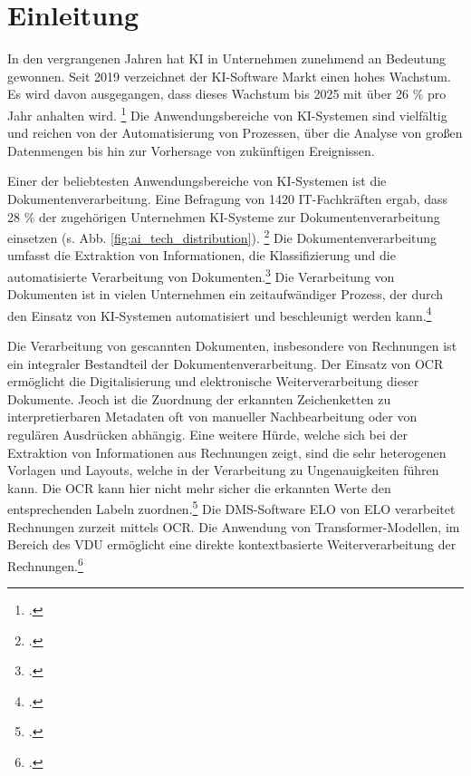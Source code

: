 \chapter{Einleitung}

In den vergrangenen Jahren hat \ac{KI} in Unternehmen zunehmend an Bedeutung gewonnen. Seit 2019 verzeichnet der KI-Software Markt einen hohes Wachstum. Es wird davon ausgegangen, dass dieses Wachstum bis 2025 mit über 26 \% pro Jahr anhalten wird. \footcites[Vgl.][]{howarth_57_2024} Die Anwendungsbereiche von KI-Systemen sind vielfältig und reichen von der Automatisierung von Prozessen, über die Analyse von großen Datenmengen bis hin zur Vorhersage von zukünftigen Ereignissen.

Einer der beliebtesten Anwendungsbereiche von KI-Systemen ist die Dokumentenverarbeitung. Eine Befragung von 1420 IT-Fachkräften ergab, dass 28 \% der zugehörigen Unternehmen KI-Systeme zur Dokumentenverarbeitung einsetzen (s. Abb. \ref{fig:ai_tech_distribution}). \footcites[Vgl.][]{rackspace_most_2023} Die Dokumentenverarbeitung umfasst die Extraktion von Informationen, die Klassifizierung und die automatisierte Verarbeitung von Dokumenten.\footcites[Vgl.][S.1]{esposito_intelligent_2005} Die Verarbeitung von Dokumenten ist in vielen Unternehmen ein zeitaufwändiger Prozess, der durch den Einsatz von KI-Systemen automatisiert und beschleunigt werden kann.\footcites[Vgl.][S.11]{dutt_now_2024}



Die Verarbeitung von gescannten Dokumenten, insbesondere von Rechnungen ist ein integraler Bestandteil der Dokumentenverarbeitung. Der Einsatz von \ac{OCR} ermöglicht die Digitalisierung und elektronische Weiterverarbeitung dieser Dokumente. Jeoch ist die Zuordnung der erkannten Zeichenketten zu interpretierbaren Metadaten oft von manueller Nachbearbeitung oder von regulären Ausdrücken abhängig. Eine weitere Hürde, welche sich bei der Extraktion von Informationen aus Rechnungen zeigt, sind die sehr heterogenen Vorlagen und Layouts, welche in der Verarbeitung zu Ungenauigkeiten führen kann. Die OCR kann hier nicht mehr sicher die erkannten Werte den entsprechenden Labeln zuordnen.\footcites[Vgl.][S.1]{rahal_information_2018} Die DMS-Software \ac{ELO} von ELO verarbeitet Rechnungen zurzeit mittels OCR. Die Anwendung von Transformer-Modellen, im Bereich des \ac{VDU} ermöglicht eine direkte kontextbasierte Weiterverarbeitung der Rechnungen.\footcites[Vgl.][S.1]{kim_ocr-free_2021}

